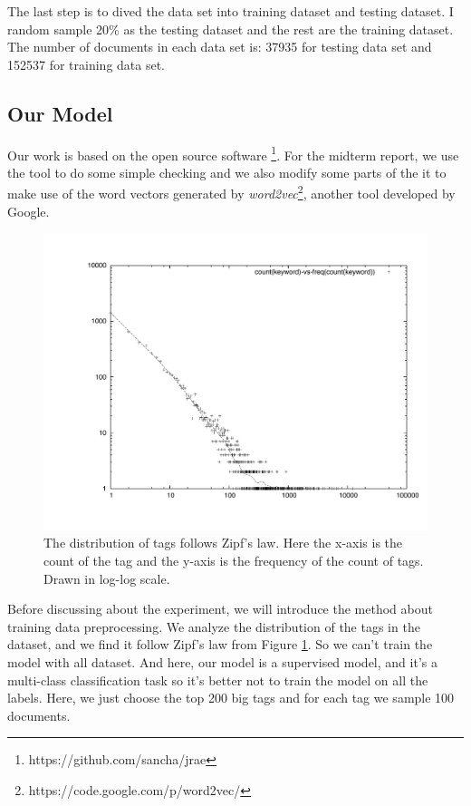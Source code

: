 \documentclass[dvips,12pt]{article}
\begin{document}
        The last step is to dived the data set into training dataset and testing dataset. I random sample 20\% as the testing dataset and the rest are the training dataset. The number of documents in each data set is: 37935 for testing data set and 152537 for training data set.
        
        \subsection{Our Model}
        Our work is based on the open source software \footnote{https://github.com/sancha/jrae}. For the midterm report, we use the tool to do some simple checking and we also modify some parts of the it to make use of the word vectors generated by \emph{word2vec}\footnote{https://code.google.com/p/word2vec/}, another tool developed by Google.
        
         \begin{figure}
         \includegraphics[scale=0.5]{dist.pdf}
         \caption{The distribution of tags follows Zipf's law. Here the x-axis is the count of the tag and the y-axis is the frequency of the count of tags. Drawn in log-log scale.}
         \label{zips}
        \end{figure}
        
        Before discussing about the experiment, we will introduce the method about training data preprocessing. We analyze the distribution of the tags in the dataset, and we find it follow Zipf's law from Figure \ref{zips}. So we can't train the model with all dataset. And here, our model is a supervised model, and it's a multi-class classification task so it's better not to train the model on all the labels. Here, we just choose the top 200 big tags and for each tag we sample 100 documents.
        
\end{document}
